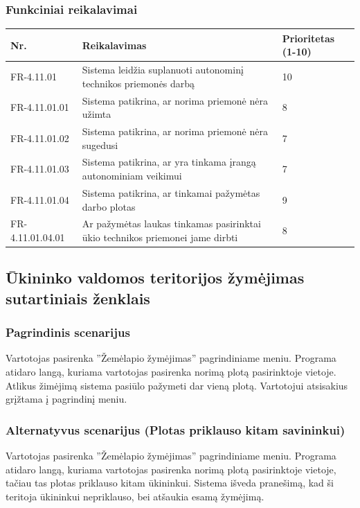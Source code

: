 \documentclass[oneside]{VUMIFPSkursinis}
\begin{document}
\subsubsection{Funkciniai reikalavimai}
\begin{table}[htbp]
	\begin{tabularx}{1\textwidth}{ |P{2.5cm}|X|P{3cm }| }  \hline
    Nr. & Reikalavimas &  Prioritetas (1-10)  \\   \hline 
    FR-4.11.01 & Sistema leidžia suplanuoti autonominį technikos priemonės darbą & 10  \\   \hline
		FR-4.11.01.01 & Sistema patikrina, ar norima priemonė nėra užimta & 8  \\ \hline
		FR-4.11.01.02 & Sistema patikrina, ar norima priemonė nėra sugedusi & 7 \\ \hline
		FR-4.11.01.03 & Sistema patikrina, ar yra tinkama įrangą autonominiam veikimui & 7 \\  \hline
		FR-4.11.01.04 & Sistema patikrina, ar tinkamai pažymėtas darbo plotas & 9  \\ \hline
	FR-4.11.01.04.01 & Ar pažymėtas laukas tinkamas pasirinktai ūkio technikos priemonei jame dirbti & 8 \\ \hline
	\end{tabularx}
\end{table}

\subsection{Ūkininko valdomos teritorijos žymėjimas sutartiniais ženklais}
	\subsubsection{Pagrindinis scenarijus}
	Vartotojas pasirenka ''Žemėlapio žymėjimas'' pagrindiniame meniu. Programa atidaro langą, kuriama vartotojas pasirenka norimą plotą pasirinktoje vietoje. Atlikus žimėjimą sistema pasiūlo pažymeti dar vieną plotą. Vartotojui atsisakius grįžtama į pagrindinį meniu.
	\subsubsection{Alternatyvus scenarijus (Plotas priklauso kitam savininkui)}
	Vartotojas pasirenka ''Žemėlapio žymėjimas'' pagrindiniame meniu. Programa atidaro langą, kuriama vartotojas pasirenka norimą plotą pasirinktoje vietoje, tačiau tas plotas priklauso kitam ūkininkui. Sistema išveda pranešimą, kad ši teritoja ūkininkui nepriklauso, bei atšaukia esamą žymėjimą.
\end{document}
